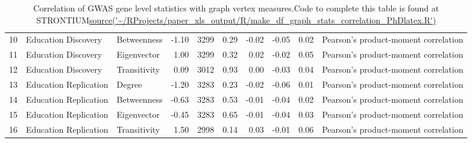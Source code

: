 \begin{table}[ht]
\begin{adjustbox}{max width=\textwidth}
\begin{tabular}{rllrlrrrrl}
  10 & Education Discovery & Betweenness & -1.10 & 3299 & 0.29 & -0.02 & -0.05 & 0.02 & Pearson's product-moment correlation \\ 
  11 & Education Discovery & Eigenvector & 1.00 & 3299 & 0.32 & 0.02 & -0.02 & 0.05 & Pearson's product-moment correlation \\ 
  12 & Education Discovery & Transitivity & 0.09 & 3012 & 0.93 & 0.00 & -0.03 & 0.04 & Pearson's product-moment correlation \\ 
  13 & Education Replication & Degree & -1.20 & 3283 & 0.23 & -0.02 & -0.06 & 0.01 & Pearson's product-moment correlation \\ 
  14 & Education Replication & Betweenness & -0.63 & 3283 & 0.53 & -0.01 & -0.04 & 0.02 & Pearson's product-moment correlation \\ 
  15 & Education Replication & Eigenvector & -0.45 & 3283 & 0.65 & -0.01 & -0.04 & 0.03 & Pearson's product-moment correlation \\ 
  16 & Education Replication & Transitivity & 1.50 & 2998 & 0.14 & 0.03 & -0.01 & 0.06 & Pearson's product-moment correlation \\ 
   \hline
\end{tabular}
\end{adjustbox}
\caption{Correlation of GWAS gene level statistics with graph vertex measures.Code to complete this table is found at STRONTIUM\url{source('~/RProjects/paper_xls_output/R/make_df_graph_stats_correlation_PhDlatex.R')}}
\label{Table:Correlation of GWAS gene level statistics with graph vertex measures}
\end{table}

